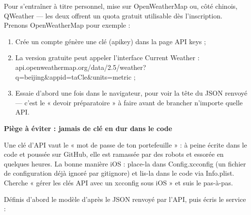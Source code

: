 


Pour s'entraîner à titre personnel, mise sur OpenWeatherMap ou, côté chinois, QWeather — les deux offrent un quota gratuit utilisable dès l'inscription. Prenons OpenWeatherMap pour exemple :

\begin{enumerate}
  \item Crée un compte génère une clé (apikey) dans la page API keys ;
  \item La version gratuite peut appeler l'interface Current Weather : api.openweathermap.org/data/2.5/weather? q=beijing\&appid=taCle\&units=metric ;
  \item Essaie d'abord une fois dans le navigateur, pour voir la tête du JSON renvoyé — c'est le « devoir préparatoire » à faire avant de brancher n'importe quelle API.
\end{enumerate}

\textbf{Piège à éviter : jamais de clé en dur dans le code}\par

Une clé d'API vaut le « mot de passe de ton portefeuille » : à peine écrite dans le code et poussée sur GitHub, elle est ramassée par des robots et essorée en quelques heures. La bonne manière iOS : place-la dans Config.xcconfig (un fichier de configuration déjà ignoré par gitignore) et lis-la dans le code via Info.plist. Cherche « gérer les clés API avec un xcconfig sous iOS » et suis le pas-à-pas.


Définis d'abord le modèle d'après le JSON renvoyé par l'API, puis écris le service :

